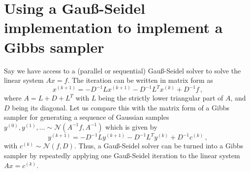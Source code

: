 \documentclass[
fontsize=11pt,
paper=a4,
numbers=noenddot
]{scrartcl}
\begin{document}
\section{Using a Gauß-Seidel implementation to implement a Gibbs sampler}
Say we have access to a (parallel or sequential) Gauß-Seidel solver to solve the linear system
$Ax = f$. The iteration can be written in matrix form as 
\begin{equation*}
    x^{(k+1)} = -D^{-1} L x^{(k+1)} - D^{-1}L^T x^{(k)} + D^{-1} f\,,
\end{equation*}
where $A = L + D + L^T$ with $L$ being the strictly lower triangular part of $A$, and $D$ being its diagonal. Let us compare this with the matrix form of a Gibbs sampler for generating a sequence of Gaussian samples $y^{(0)}, y^{(1)},\dotsc \sim \mathcal{N}(A^{-1}f, A^{-1})$ which is given by
\begin{equation*}
    y^{(k+1)} = - D^{-1} L y^{(k+1)} - D^{-1} L^T y^{(k)} + D^{-1} c^{(k)}\,,
\end{equation*}
with $c^{(k)} \sim \mathcal{N}(f, D)$. Thus, a Gauß-Seidel solver can be turned into a Gibbs sampler by repeatedly applying one Gauß-Seidel iteration to the linear system $Ax = c^{(k)}$.

\printbibliography
\end{document}
